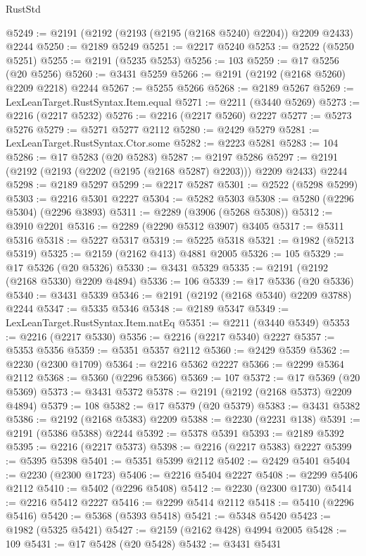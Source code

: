 \begin{lexlean}{RustStd}
\begin{coremodule}
@5249 := @2191 (@2192 (@2193 (@2195 (@2168 @5240) @2204)) @2209 @2433) @2244
@5250 := @2189 @5249
@5251 := @2217 @5240
@5253 := @2522 (@5250 @5251)
@5255 := @2191 (@5235 @5253)
@5256 := 103
@5259 := @17 @5256 (@20 @5256)
@5260 := @3431 @5259
@5266 := @2191 (@2192 (@2168 @5260) @2209 @2218) @2244
@5267 := @5255 @5266
@5268 := @2189 @5267
@5269 := LexLeanTarget.RustSyntax.Item.equal
@5271 := @2211 (@3440 @5269)
@5273 := @2216 (@2217 @5232)
@5276 := @2216 (@2217 @5260) @2227
@5277 := @5273 @5276
@5279 := @5271 @5277 @2112
@5280 := @2429 @5279
@5281 := LexLeanTarget.RustSyntax.Ctor.some
@5282 := @2223 @5281
@5283 := 104
@5286 := @17 @5283 (@20 @5283)
@5287 := @2197 @5286
@5297 := @2191 (@2192 (@2193 (@2202 (@2195 (@2168 @5287) @2203))) @2209 @2433) @2244
@5298 := @2189 @5297
@5299 := @2217 @5287
@5301 := @2522 (@5298 @5299)
@5303 := @2216 @5301 @2227
@5304 := @5282 @5303
@5308 := @5280 (@2296 @5304) (@2296 @3893)
@5311 := @2289 (@3906 (@5268 @5308))
@5312 := @3910 @2201
@5316 := @2289 (@2290 @5312 @3907) @3405
@5317 := @5311 @5316
@5318 := @5227 @5317
@5319 := @5225 @5318
@5321 := @1982 (@5213 @5319)
@5325 := @2159 (@2162 @413) @4881 @2005
@5326 := 105
@5329 := @17 @5326 (@20 @5326)
@5330 := @3431 @5329
@5335 := @2191 (@2192 (@2168 @5330) @2209 @4894)
@5336 := 106
@5339 := @17 @5336 (@20 @5336)
@5340 := @3431 @5339
@5346 := @2191 (@2192 (@2168 @5340) @2209 @3788) @2244
@5347 := @5335 @5346
@5348 := @2189 @5347
@5349 := LexLeanTarget.RustSyntax.Item.natEq
@5351 := @2211 (@3440 @5349)
@5353 := @2216 (@2217 @5330)
@5356 := @2216 (@2217 @5340) @2227
@5357 := @5353 @5356
@5359 := @5351 @5357 @2112
@5360 := @2429 @5359
@5362 := @2230 (@2300 @1709)
@5364 := @2216 @5362 @2227
@5366 := @2299 @5364 @2112
@5368 := @5360 (@2296 @5366)
@5369 := 107
@5372 := @17 @5369 (@20 @5369)
@5373 := @3431 @5372
@5378 := @2191 (@2192 (@2168 @5373) @2209 @4894)
@5379 := 108
@5382 := @17 @5379 (@20 @5379)
@5383 := @3431 @5382
@5386 := @2192 (@2168 @5383) @2209
@5388 := @2230 (@2231 @138)
@5391 := @2191 (@5386 @5388) @2244
@5392 := @5378 @5391
@5393 := @2189 @5392
@5395 := @2216 (@2217 @5373)
@5398 := @2216 (@2217 @5383) @2227
@5399 := @5395 @5398
@5401 := @5351 @5399 @2112
@5402 := @2429 @5401
@5404 := @2230 (@2300 @1723)
@5406 := @2216 @5404 @2227
@5408 := @2299 @5406 @2112
@5410 := @5402 (@2296 @5408)
@5412 := @2230 (@2300 @1730)
@5414 := @2216 @5412 @2227
@5416 := @2299 @5414 @2112
@5418 := @5410 (@2296 @5416)
@5420 := @5368 (@5393 @5418)
@5421 := @5348 @5420
@5423 := @1982 (@5325 @5421)
@5427 := @2159 (@2162 @428) @4994 @2005
@5428 := 109
@5431 := @17 @5428 (@20 @5428)
@5432 := @3431 @5431

\end{coremodule}
\end{lexlean}
